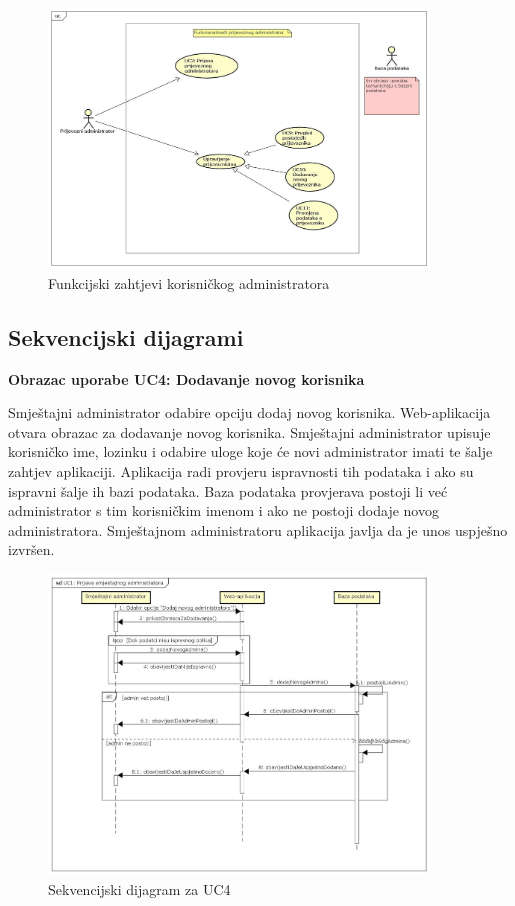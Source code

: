 					\begin{figure}[htbp]
						\centering
						\includegraphics[width=0.9\textwidth]{dijagrami/fun_kor}
						\caption{Funkcijski zahtjevi korisničkog administratora}
						\label{fig:funKor}
					\end{figure}
				\eject		
				
			\subsection{Sekvencijski dijagrami}
			\textbf{Obrazac uporabe UC4: Dodavanje novog korisnika}
			
			Smještajni administrator odabire opciju dodaj novog korisnika. Web-aplikacija otvara obrazac za dodavanje novog korisnika. Smještajni administrator upisuje korisničko ime, lozinku i odabire uloge koje će novi administrator imati te šalje zahtjev aplikaciji. Aplikacija radi provjeru ispravnosti tih podataka i ako su ispravni šalje ih bazi podataka. Baza podataka provjerava postoji li već administrator s tim korisničkim imenom i ako ne postoji dodaje novog administratora. Smještajnom administratoru aplikacija javlja da je unos uspješno izvršen.
			\begin{figure}[htbp]
				\centering
				\includegraphics[width=0.9\textwidth]{dijagrami/sec_uc4}
				\caption{Sekvencijski dijagram za UC4}
				\label{fig:secUC4}
			\end{figure}
			\eject
			
